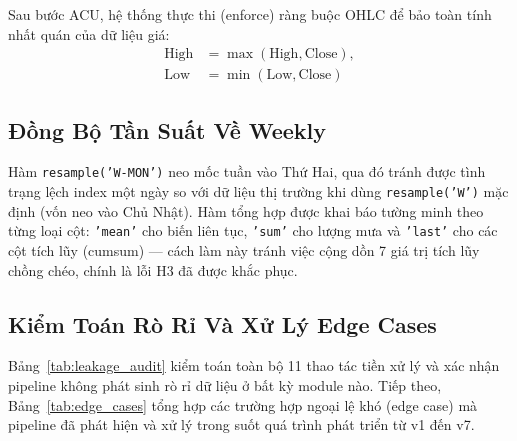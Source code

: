 \documentclass[conference]{IEEEtran}
\begin{document}
Sau bước ACU, hệ thống thực thi (enforce) ràng buộc OHLC để bảo toàn tính
nhất quán của dữ liệu giá:
\begin{equation}
\begin{aligned}
\text{High} &= \max(\text{High}, \text{Close}), \\
\text{Low}  &= \min(\text{Low},  \text{Close})
\end{aligned}
\label{eq:ohlc}
\end{equation}

\subsection{Đồng Bộ Tần Suất Về Weekly}

Hàm \texttt{resample('W-MON')} neo mốc tuần vào Thứ Hai, qua đó tránh được
tình trạng lệch index một ngày so với dữ liệu thị trường khi dùng
\texttt{resample('W')} mặc định (vốn neo vào Chủ Nhật). Hàm tổng hợp được
khai báo tường minh theo từng loại cột: \texttt{'mean'} cho biến liên tục,
\texttt{'sum'} cho lượng mưa và \texttt{'last'} cho các cột tích lũy (cumsum)
--- cách làm này tránh việc cộng dồn 7 giá trị tích lũy chồng chéo, chính là
lỗi H3 đã được khắc phục.

\subsection{Kiểm Toán Rò Rỉ Và Xử Lý Edge Cases}

Bảng~\ref{tab:leakage_audit} kiểm toán toàn bộ 11 thao tác tiền xử lý và xác
nhận pipeline không phát sinh rò rỉ dữ liệu ở bất kỳ module nào. Tiếp theo,
Bảng~\ref{tab:edge_cases} tổng hợp các trường hợp ngoại lệ khó (edge case) mà
pipeline đã phát hiện và xử lý trong suốt quá trình phát triển từ v1 đến v7.
\end{document}
